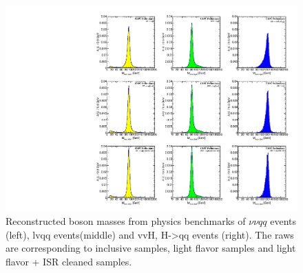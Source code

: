 %
\begin{figure}[h!]
\centering
\includegraphics[scale=0.56]{Figures/Performance/peizhu/HZW_mass_withoutGrid9.pdf}
\caption{ Reconstructed boson masses from physics benchmarks of $\nu\nu qq$ events (left), lvqq events(middle) and vvH, H->qq events (right). The raws are corresponding to inclusive samples, light flavor samples and light flavor + ISR cleaned samples.  }
\label{fig:jet-HZW}
\end{figure}



